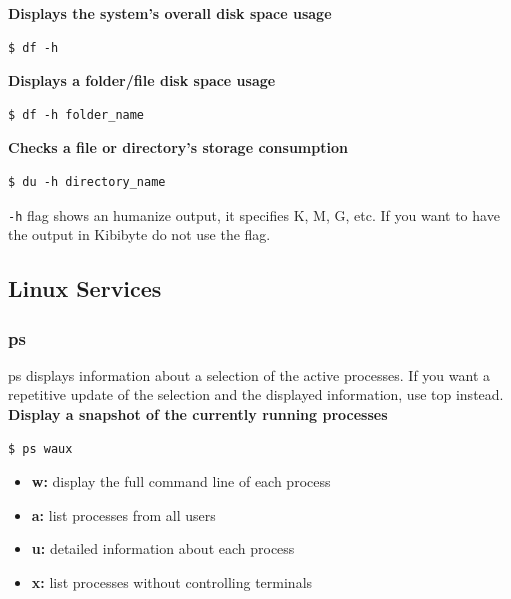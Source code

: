 \documentclass{article}
\newenvironment{blocktemplate}[1]{%
    \tcolorbox[beamer,%
    noparskip,breakable,
    colframe=Blue,%
    colbacklower=LimeGreen!75!LightGreen,%
    title=#1]}%
    {\endtcolorbox}
\newenvironment{codetemplate}[1][]{%
  \mybasecolorbox[#1]
  \itshape
}{%
  \endmybasecolorbox
}
\begin{document}
\textbf{Displays the system’s overall disk space usage}
\begin{codetemplate}{}
\begin{verbatim}
$ df -h
\end{verbatim}
\end{codetemplate}

\textbf{Displays a folder/file disk space usage}
\begin{codetemplate}{}
\begin{verbatim}
$ df -h folder_name
\end{verbatim}
\end{codetemplate}

\textbf{Checks a file or directory’s storage consumption}
\begin{codetemplate}{}
\begin{verbatim}
$ du -h directory_name
\end{verbatim}
\end{codetemplate}

\begin{blocktemplate}{NOTE}
\verb|-h| flag shows an humanize output, it specifies K, M, G, etc. If you want to have the output in Kibibyte do not use the flag.
\end{blocktemplate}

\subsection{Linux Services}

\subsubsection{ps}
ps displays information about a selection of the active processes.  If you want a repetitive update of the selection and the displayed information, use top instead.
\textbf{Display a snapshot of the currently running processes}
\begin{codetemplate}{}
\begin{verbatim}
$ ps waux
\end{verbatim}
\end{codetemplate}
\begin{itemize}
    \item \textbf{w:} display the full command line of each process
    \item \textbf{a:} list processes from all users
    \item \textbf{u:} detailed information about each process
    \item \textbf{x:} list processes without controlling terminals
\end{itemize}
\end{document}
